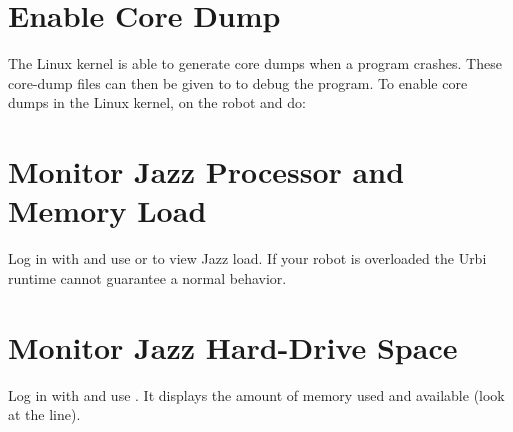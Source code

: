 \section{Enable Core Dump}

The Linux kernel is able to generate core dumps when a program
crashes. These core-dump files can then be given to  to debug
the program. To enable core dumps in the Linux kernel,  on the
robot and do:







\section{Monitor Jazz Processor and Memory Load}

Log in with  and use  or  to view
Jazz load.  If your robot is overloaded the Urbi runtime cannot guarantee a
normal behavior.

\section{Monitor Jazz Hard-Drive Space}

Log in with  and use . It displays the amount of
memory used and available (look at the  line).



